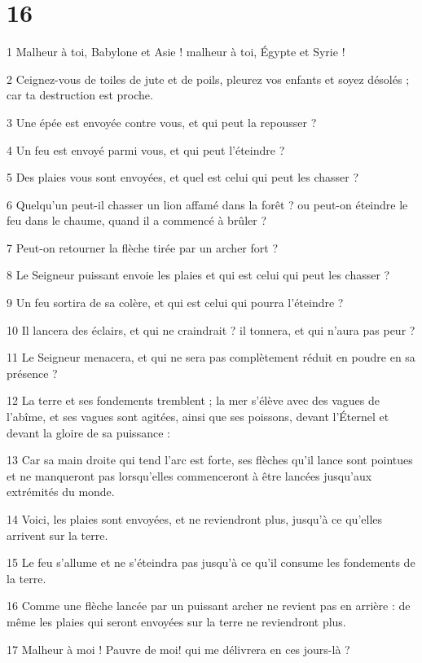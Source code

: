 \chapter{16}

\par 1 Malheur à toi, Babylone et Asie ! malheur à toi, Égypte et Syrie !
\par 2 Ceignez-vous de toiles de jute et de poils, pleurez vos enfants et soyez désolés ; car ta destruction est proche.
\par 3 Une épée est envoyée contre vous, et qui peut la repousser ?
\par 4 Un feu est envoyé parmi vous, et qui peut l'éteindre ?
\par 5 Des plaies vous sont envoyées, et quel est celui qui peut les chasser ?
\par 6 Quelqu'un peut-il chasser un lion affamé dans la forêt ? ou peut-on éteindre le feu dans le chaume, quand il a commencé à brûler ?
\par 7 Peut-on retourner la flèche tirée par un archer fort ?
\par 8 Le Seigneur puissant envoie les plaies et qui est celui qui peut les chasser ?
\par 9 Un feu sortira de sa colère, et qui est celui qui pourra l'éteindre ?
\par 10 Il lancera des éclairs, et qui ne craindrait ? il tonnera, et qui n'aura pas peur ?
\par 11 Le Seigneur menacera, et qui ne sera pas complètement réduit en poudre en sa présence ?
\par 12 La terre et ses fondements tremblent ; la mer s'élève avec des vagues de l'abîme, et ses vagues sont agitées, ainsi que ses poissons, devant l'Éternel et devant la gloire de sa puissance :
\par 13 Car sa main droite qui tend l'arc est forte, ses flèches qu'il lance sont pointues et ne manqueront pas lorsqu'elles commenceront à être lancées jusqu'aux extrémités du monde.
\par 14 Voici, les plaies sont envoyées, et ne reviendront plus, jusqu'à ce qu'elles arrivent sur la terre.
\par 15 Le feu s'allume et ne s'éteindra pas jusqu'à ce qu'il consume les fondements de la terre.
\par 16 Comme une flèche lancée par un puissant archer ne revient pas en arrière : de même les plaies qui seront envoyées sur la terre ne reviendront plus.
\par 17 Malheur à moi ! Pauvre de moi! qui me délivrera en ces jours-là ?
